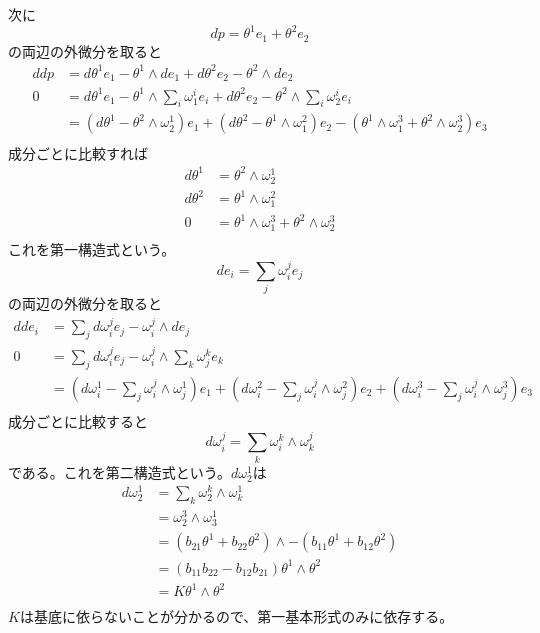         次に
            \[dp = \theta^1e_1 + \theta^2e_2\]
        の両辺の外微分を取ると
        \begin{align*}
            ddp &= d\theta^1e_1 - \theta^1 \wedge de_1 + d\theta^2e_2 - \theta^2 \wedge de_2\\
            0 &= d\theta^1e_1 - \theta^1 \wedge \sum_i \omega^i_1e_i + d\theta^2e_2 - \theta^2 \wedge \sum_i \omega^i_2e_i\\
            &= (d\theta^1 - \theta^2 \wedge \omega^1_2)e_1 + (d\theta^2 - \theta^1 \wedge \omega^2_1)e_2 - (\theta^1 \wedge \omega^3_1 + \theta^2 \wedge \omega^3_2)e_3\\
        \end{align*}
        成分ごとに比較すれば
        \begin{align*}
            d\theta^1 &= \theta^2 \wedge \omega^1_2\\
            d\theta^2 &= \theta^1 \wedge \omega^2_1\\
            0 &= \theta^1 \wedge \omega^3_1 + \theta^2 \wedge \omega^3_2\\
        \end{align*}
        これを第一構造式という。
            \[de_i = \sum_j \omega^j_ie_j\]
        の両辺の外微分を取ると
        \begin{align*}
            dde_i &= \sum_j d\omega^j_ie_j - \omega^j_i \wedge de_j\\
            0 &= \sum_j d\omega^j_ie_j - \omega^j_i \wedge \sum_k \omega^k_je_k\\
            &= (d\omega^1_i - \sum_j \omega^j_i \wedge \omega^1_j)e_1 + (d\omega^2_i - \sum_j \omega^j_i \wedge \omega^2_j)e_2 + (d\omega^3_i - \sum_j \omega^j_i \wedge \omega^3_j)e_3\\
        \end{align*}
        成分ごとに比較すると
            \[d\omega^j_i = \sum_k \omega^k_i \wedge \omega^j_k\]
        である。これを第二構造式という。$d\omega^1_2$は
        \begin{align*}
            d\omega^1_2 &= \sum_k \omega^k_2 \wedge \omega^1_k\\
            &= \omega^3_2 \wedge \omega^1_3\\
            &= (b_{21}\theta^1 + b_{22}\theta^2) \wedge -(b_{11}\theta^1 + b_{12}\theta^2)\\
            &= (b_{11}b_{22} - b_{12}b_{21})\theta^1 \wedge \theta^2\\
            &= K\theta^1 \wedge \theta^2\\
        \end{align*}
        $K$は基底に依らないことが分かるので、第一基本形式のみに依存する。

